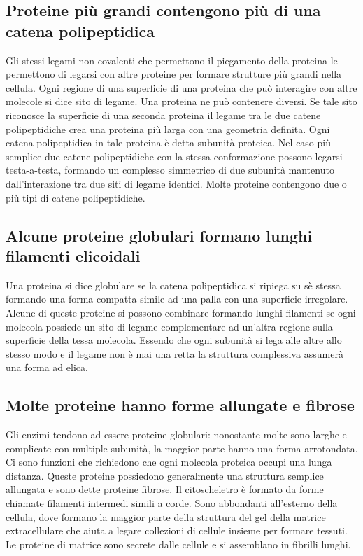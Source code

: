 \subsection{Proteine pi\`u grandi contengono pi\`u di una catena polipeptidica}
Gli stessi legami non covalenti che permettono il piegamento della proteina le permettono di legarsi con altre proteine per formare strutture pi\`u grandi nella cellula. Ogni regione di
una superficie di una proteina che pu\`o interagire con altre molecole si dice sito di legame. Una proteina ne pu\`o contenere diversi. Se tale sito riconosce la superficie di una 
seconda proteina il legame tra le due catene polipeptidiche crea una proteina pi\`u larga con una geometria definita. Ogni catena polipeptidica in tale proteina \`e detta subunit\`a 
proteica. Nel caso pi\`u semplice due catene polipeptidiche con la stessa conformazione possono legarsi testa-a-testa, formando un complesso simmetrico di due subunit\`a mantenuto 
dall'interazione tra due siti di legame identici. Molte proteine contengono due o pi\`u tipi di catene polipeptidiche.
\subsection{Alcune proteine globulari formano lunghi filamenti elicoidali}
Una proteina si dice globulare se la catena polipeptidica si ripiega su s\`e stessa formando una forma compatta simile ad una palla con una superficie irregolare. Alcune di queste 
proteine si possono combinare formando lunghi filamenti se ogni molecola possiede un sito di legame complementare ad un'altra regione sulla superficie della tessa molecola. Essendo che
ogni subunit\`a si lega alle altre allo stesso modo e il legame non \`e mai una retta la struttura complessiva assumer\`a una forma ad elica. 
\subsection{Molte proteine hanno forme allungate e fibrose}
Gli enzimi tendono ad essere proteine globulari: nonostante molte sono larghe e complicate con multiple subunit\`a, la maggior parte hanno una forma arrotondata. Ci sono funzioni che
richiedono che ogni molecola proteica occupi una lunga distanza. Queste proteine possiedono generalmente una struttura semplice allungata e sono dette proteine fibrose. Il citoscheletro
\`e formato da forme chiamate filamenti intermedi simili a corde. Sono abbondanti all'esterno della cellula, dove formano la maggior parte della struttura del gel della matrice
extracellulare che aiuta  a legare collezioni di cellule insieme per formare tessuti. Le proteine di matrice sono secrete dalle cellule e si assemblano in fibrilli lunghi.
